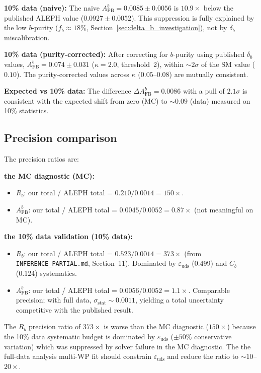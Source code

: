 \documentclass[11pt,a4paper]{article}
\begin{document}
\textbf{10\% data (naive):} The naive $A_\mathrm{FB}^b = 0.0085 \pm 0.0056$
is $10.9\times$ below the published ALEPH value ($0.0927 \pm 0.0052$). This
suppression is fully explained by the low $b$-purity ($f_b \approx 18\%$,
Section~\ref{sec:delta_b_investigation}), not by $\delta_b$ miscalibration.

\textbf{10\% data (purity-corrected):} After correcting for $b$-purity using published
$\delta_b$ values, $A_\mathrm{FB}^b = 0.074 \pm 0.031$ ($\kappa = 2.0$, threshold~2),
within $\sim 2\sigma$ of the SM value ($0.10$). The purity-corrected values across
$\kappa$ ($0.05$--$0.08$) are mutually consistent.

\textbf{Expected vs 10\% data:} The difference $\Delta A_\mathrm{FB}^b = 0.0086$ with
a pull of $2.1\sigma$ is consistent with
the expected shift from zero (MC) to $\sim 0.09$ (data) measured on 10\% statistics.

\subsection{Precision comparison}
\label{sec:precision_comparison}

The precision ratios are:

\textbf{the MC diagnostic (MC):}
\begin{itemize}
\item $R_b$: our total / ALEPH total = $0.210/0.0014 = 150\times$.
\item $A_\mathrm{FB}^b$: our total / ALEPH total = $0.0045/0.0052 = 0.87\times$
(not meaningful on MC).
\end{itemize}

\textbf{the 10\% data validation (10\% data):}
\begin{itemize}
\item $R_b$: our total / ALEPH total = $0.523/0.0014 = 373\times$
(from \texttt{INFERENCE\_PARTIAL.md}, Section~11). Dominated by
$\varepsilon_\mathrm{uds}$ (0.499) and $C_b$ (0.124) systematics.
\item $A_\mathrm{FB}^b$: our total / ALEPH total = $0.0056/0.0052 = 1.1\times$.
Comparable precision; with full data, $\sigma_\mathrm{stat} \sim 0.0011$, yielding
a total uncertainty competitive with the published result.
\end{itemize}

The $R_b$ precision ratio of $373\times$ is worse than the MC diagnostic ($150\times$) because
the 10\% data systematic budget is dominated by $\varepsilon_\mathrm{uds}$ ($\pm 50\%$
conservative variation) which was suppressed by solver failure in the MC diagnostic. The
the full-data analysis multi-WP fit should constrain $\varepsilon_\mathrm{uds}$ and reduce the ratio
to $\sim 10$--$20\times$.
\end{document}
